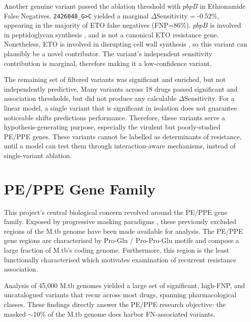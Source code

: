 Another genuine variant passed the ablation threshold with $pbpB$ in Ethionamide False Negatives. \texttt{2426048\_G>C} yielded a marginal $\Delta$Sensitivity = -0.52\%, appearing in the majority of ETO false negatives (FNP=86\%). $pbpB$ is involved in peptidoglycan synthesis \cite{mukherjee2009novel, dejesus2017comprehensive}, and is not a canonical ETO resistance gene. Nonetheless, ETO is involved in disrupting cell wall synthesis \cite{Ushtanitetal2022}, so this variant can plausibly be a novel contributor. The variant's independent sensitivity contribution is marginal, therefore making it a low-confidence variant. 

The remaining set of filtered variants was significant and enriched, but not independently predictive. Many variants across 18 drugs passed significant and association thresholds, but did not produce any calculable $\Delta$Sensitivity. For a linear model, a single variant that is significant in isolation does not guarantee noticeable shifts predictions performance. Therefore, these variants serve a hypothesis-generating purpose, especially the virulent but poorly-studied PE/PPE genes. These variants cannot be labelled as determinants of resistance, until a model can test them through interaction-aware mechanisms, instead of single-variant ablation. 

\section{PE/PPE Gene Family}
This project's central biological concern revolved around the PE/PPE gene family. Exposed by progressive masking paradigms \cite{marin2022benchmarking, modlin2021exact}, these previously excluded regions of the M.tb genome have been made available for analysis. The PE/PPE gene regions are characterised by Pro-Glu / Pro-Pro-Glu motifs and compose a large fraction of M.tb's coding genome. Furthermore, this region is the least functionally characterised \cite{McEvoy2016, cole1998deciphering} which motivates examination of recurrent resistance association. 

Analysis of 45,000 M.tb genomes yielded a large set of significant, high-FNP, and uncatalogued variants that recur across most drugs, spanning pharmacological classes. These findings directly answer the PE/PPE research objective: the masked $\sim$10\% of the M.tb genome does harbor FN-associated variants. 

